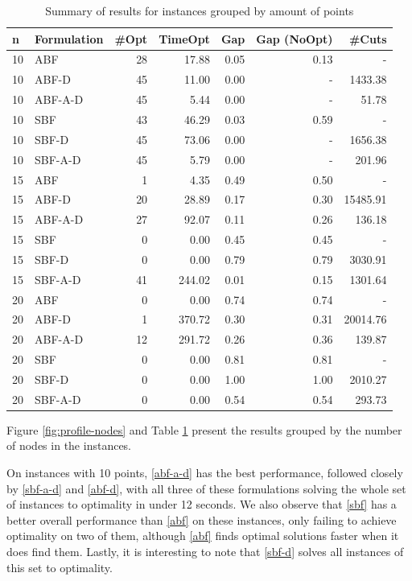 \documentclass[pdflatex,sn-mathphys-num]{sn-jnl}%
\begin{document}
\begin{table}[h]
\centering
\begin{tabular}{l l r r r r r}
\toprule
n & Formulation & \#Opt & TimeOpt & Gap & Gap (NoOpt) & \#Cuts \\
\midrule
10 & ABF & 28 & 17.88 & 0.05 & 0.13 & - \\
10 & ABF-D & 45 & 11.00 & 0.00 & - & 1433.38 \\
10 & ABF-A-D & 45 & 5.44 & 0.00 & - & 51.78 \\
10 & SBF & 43 & 46.29 & 0.03 & 0.59 & - \\
10 & SBF-D & 45 & 73.06 & 0.00 & - & 1656.38 \\
10 & SBF-A-D & 45 & 5.79 & 0.00 & - & 201.96 \\
15 & ABF & 1 & 4.35 & 0.49 & 0.50 & - \\
15 & ABF-D & 20 & 28.89 & 0.17 & 0.30 & 15485.91 \\
15 & ABF-A-D & 27 & 92.07 & 0.11 & 0.26 & 136.18 \\
15 & SBF & 0 & 0.00 & 0.45 & 0.45 & - \\
15 & SBF-D & 0 & 0.00 & 0.79 & 0.79 & 3030.91 \\
15 & SBF-A-D & 41 & 244.02 & 0.01 & 0.15 & 1301.64 \\
20 & ABF & 0 & 0.00 & 0.74 & 0.74 & - \\
20 & ABF-D & 1 & 370.72 & 0.30 & 0.31 & 20014.76 \\
20 & ABF-A-D & 12 & 291.72 & 0.26 & 0.36 & 139.87 \\
20 & SBF & 0 & 0.00 & 0.81 & 0.81 & - \\
20 & SBF-D & 0 & 0.00 & 1.00 & 1.00 & 2010.27 \\
20 & SBF-A-D & 0 & 0.00 & 0.54 & 0.54 & 293.73 \\
\bottomrule
\end{tabular}
\caption{Summary of results for instances grouped by amount of points}
\label{tab:general performance nodes}
\end{table}

Figure \ref{fig:profile-nodes} and Table \ref{tab:general performance nodes} present the results grouped by the number of nodes in the instances. 

On instances with 10 points, \ref{abf-a-d} has the best performance, followed closely by \ref{sbf-a-d} and \ref{abf-d}, with all three of these formulations solving the whole set of instances to optimality in under 12 seconds. We also observe that \ref{sbf} has a better overall performance than \ref{abf} on these instances, only failing to achieve optimality on two of them, although \ref{abf} finds optimal solutions faster when it does find them. Lastly, it is interesting to note that \ref{sbf-d} solves all instances of this set to optimality. 
\end{document}
